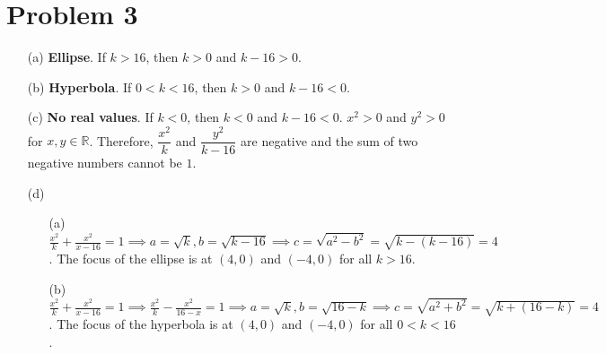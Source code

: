 \documentclass{article}
\begin{document}
\section*{Problem 3}
\begin{itemize}
\item[(a)]
\textbf{Ellipse}. If $k>16$, then $k>0$ and $k-16>0$.

\item[(b)]
\textbf{Hyperbola}. If $0<k<16$, then $k>0$ and $k-16<0$.

\item[(c)]
\textbf{No real values}. If $k<0$, then $k<0$ and $k-16<0$. $x^2>0$ and $y^2>0$ for $x,y\in\mathbb{R}$. Therefore, $\dfrac{x^2}{k}$ and $\dfrac{y^2}{k-16}$ are negative and the sum of two negative numbers cannot be $1$.

\item[(d)]
	\begin{itemize}
	\item[(a)]
		$\displaystyle \frac{x^2}{k}+\frac{x^2}{x-16}=1 \implies a=\sqrt{k},b=\sqrt{k-16} \implies c=\sqrt{a^2-b^2}=\sqrt{k-(k-16)}=4$. The focus of the ellipse is at $(4,0)$ and $(-4,0)$ for all $k>16$.

	\item[(b)]
		$\displaystyle \frac{x^2}{k}+\frac{x^2}{x-16}=1 \implies \frac{x^2}{k}-\frac{x^2}{16-x}=1 \implies a=\sqrt{k},b=\sqrt{16-k} \implies c=\sqrt{a^2+b^2}=\sqrt{k+(16-k)}=4$. The focus of the hyperbola is at $(4,0)$ and $(-4,0)$ for all $0<k<16$.
	\end{itemize}
\end{itemize}
\end{document}

